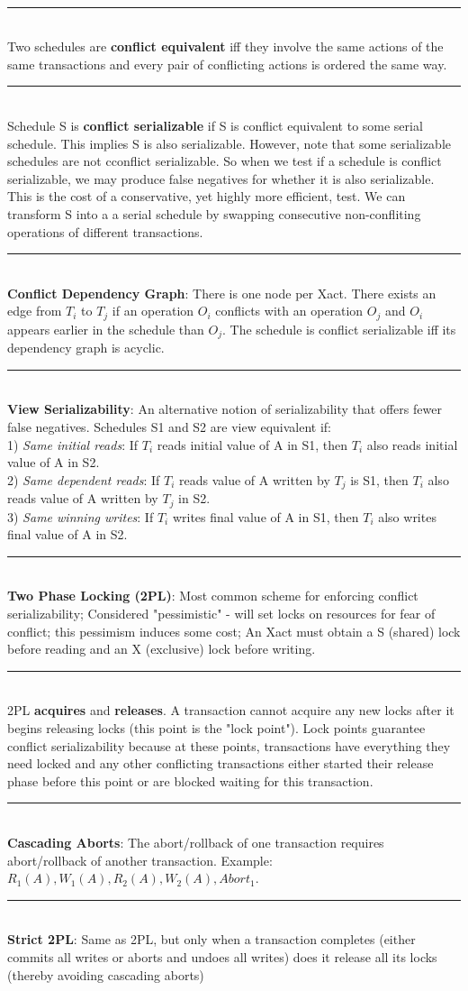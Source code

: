\documentclass[10pt,landscape]{article}
\newcommand{\ruler}{\\\rule{\columnwidth}{0.25pt}\\}
\begin{document}
\begin{multicols*}{3}
\ruler
Two schedules are \textbf{conflict equivalent} iff they involve the same actions of the same transactions and every pair of conflicting actions is ordered the same way.
\ruler
Schedule S is \textbf{conflict serializable} if S is conflict equivalent to some serial schedule. This implies S is also serializable. However, note that some serializable schedules are not cconflict serializable. So when we test if a schedule is conflict serializable, we may produce false negatives for whether it is also serializable. This is the cost of a conservative, yet highly more efficient, test. We can transform S into a a serial schedule by swapping consecutive non-confliting operations of different transactions.
\ruler
\textbf{Conflict Dependency Graph}: There is one node per Xact. There exists an edge from $T_i$ to $T_j$ if an operation $O_i$ conflicts with an operation $O_j$ and $O_i$ appears earlier in the schedule than $O_j$. The schedule is conflict serializable iff its dependency graph is acyclic.
\ruler
\textbf{View Serializability}: An alternative notion of serializability that offers fewer false negatives. Schedules S1 and S2 are view equivalent if:\\
1) \textit{Same initial reads}: If $T_i$ reads initial value of A in S1, then $T_i$ also reads initial value of A in S2.\\
2) \textit{Same dependent reads}: If $T_i$  reads value of A written by $T_j$ is S1, then $T_i$ also reads value of A written by $T_j$ in S2.\\
3) \textit{Same winning writes}: If $T_i$ writes final value of A in S1, then $T_i$ also writes final value of A in S2.
\ruler
\textbf{Two Phase Locking (2PL)}: Most common scheme for enforcing conflict serializability; Considered "pessimistic" - will set locks on resources for fear of conflict; this pessimism induces some cost; An Xact must obtain a S (shared) lock before reading and an X (exclusive) lock before writing.
\ruler
2PL \textbf{acquires} and \textbf{releases}. A transaction cannot acquire any new locks after it begins releasing locks (this point is the "lock point"). Lock points guarantee conflict serializability because at these points, transactions have everything they need locked and any other conflicting transactions either started their release phase before this point or are blocked waiting for this transaction.
\ruler
\textbf{Cascading Aborts}: The abort/rollback of one transaction requires abort/rollback of another transaction. Example: $R_1(A), W_1(A), R_2(A), W_2(A), Abort_1$.
\ruler
\textbf{Strict 2PL}: Same as 2PL, but only when a transaction completes (either commits all writes or aborts and undoes all writes) does it release all its locks (thereby avoiding cascading aborts)

\end{multicols*}
\end{document}
